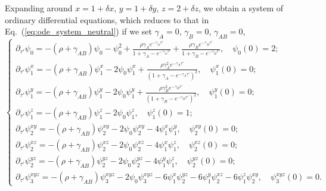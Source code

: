 \documentclass[11pt]{article}
\begin{document}
Expanding around $x=1+\delta x$, $y=1+\delta y$, $z=2+\delta z$, we obtain a system of ordinary differential equations, which reduces to that in Eq.~(\ref{eq:ode_system_neutral}) if we set $\gamma_A=0$, $\gamma_B = 0$, $\gamma_{AB} =0$,
\begin{equation}
    \begin{cases}
    \partial_{\tau'} \psi_0 = -(\rho+\gamma_{AB})\psi_0 - \psi_0^2 + \frac{\rho \gamma_A e^{-\gamma_A \tau'}}{1 + \gamma_A - e^{-\gamma_A \tau'}} + \frac{\rho \gamma_B e^{-\gamma_B \tau'}}{1 + \gamma_B - e^{-\gamma_B \tau'}}, \quad \psi_0(0) = 2; \\
    
    \partial_{\tau'} \psi_1^x = -(\rho+\gamma_{AB}) \psi_1^x -2 \psi_0 \psi_1^x + \frac{\rho \gamma_A^2 e^{-\gamma_A \tau'}}{(1 + \gamma_A - e^{-\gamma_A \tau'})^2}, \quad \psi_1^x(0) = 0; \\
    
    \partial_{\tau'} \psi_1^y = -(\rho+\gamma_{AB}) \psi_1^y -2 \psi_0 \psi_1^y + \frac{\rho \gamma_B^2 e^{-\gamma_B \tau'}}{(1 + \gamma_B - e^{-\gamma_B \tau'})^2}, \quad \psi_1^y(0) = 0; \\
    
    \partial_{\tau'} \psi_1^z = -(\rho+\gamma_{AB}) \psi_1^z - 2 \psi_0 \psi_1^z, \quad \psi_1^z(0) = 1; \\
    
    \partial_{\tau'} \psi_2^{xy} = -(\rho+\gamma_{AB}) \psi_2^{xy} - 2 \psi_0 \psi_2^{xy} - 4 \psi_1^x \psi_1^y, \quad \psi_2^{xy}(0) = 0; \\
    
    \partial_{\tau'} \psi_2^{xz} = -(\rho+\gamma_{AB}) \psi_2^{xz} - 2 \psi_0 \psi_2^{xz} - 4 \psi_1^x \psi_1^z, \quad \psi_2^{xz}(0) = 0; \\
    
    \partial_{\tau'} \psi_2^{yz} = -(\rho+\gamma_{AB}) \psi_2^{yz} - 2 \psi_0 \psi_2^{yz} - 4 \psi_1^y \psi_1^z, \quad \psi_2^{yz}(0) = 0; \\
    
    \partial_{\tau'} \psi_3^{xyz} = -(\rho+\gamma_{AB}) \psi_3^{xyz} - 2 \psi_0 \psi_3^{xyz} - 6 \psi_1^x \psi_2^{yz} - 6 \psi_1^y \psi_2^{xz} - 6 \psi_1^z \psi_2^{xy}, \quad \psi_3^{xyz}(0) = 0. 
    \end{cases}
\end{equation}\\
\end{document}
